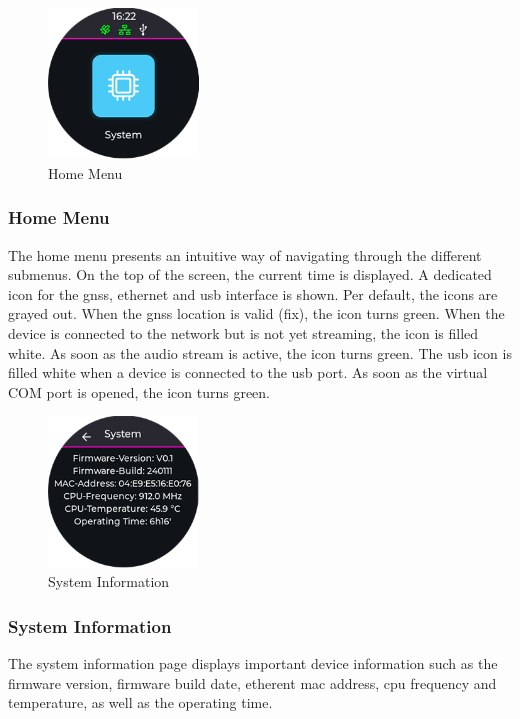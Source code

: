 \begin{minipage}{\linewidth}
	\begin{figure}
		\vspace{-0.6cm}
		\includegraphics[width=4cm]{images/6_design_final/gui/01_main_menu.png}
		\centering
		\caption{Home Menu}
		\label{fig:final_design_gui_home_menu}
	\end{figure}
	\subsubsection{Home Menu}
	The home menu presents an intuitive way of navigating through the different submenus.
	On the top of the screen, the current time is displayed.
	A dedicated icon for the \acrshort{gnss}, ethernet and \acrshort{usb} interface is shown.
	Per default, the icons are grayed out.
	When the \acrshort{gnss} location is valid (fix), the icon turns green.
	When the device is connected to the network but is not yet streaming, the icon is filled white.
	As soon as the audio stream is active, the icon turns green.
	The \acrshort{usb} icon is filled white when a device is connected to the \acrshort{usb} port.
	As soon as the virtual COM port is opened, the icon turns green.
\end{minipage}
\pagebreak

\begin{minipage}{\linewidth}
	\begin{figure}
		\vspace{-0.6cm}
		\includegraphics[width=4cm]{images/6_design_final/gui/03_system_info.png}
		\centering
		\caption{System Information}
		\label{fig:final_design_gui_system_info}
	\end{figure}
	\subsubsection{System Information}
	The system information page displays important device information such as the firmware version,
	firmware build date, etherent \acrshort{mac} address, \acrshort{cpu} frequency and temperature, as well as the operating time.
\end{minipage}
\vspace{1.3cm}

